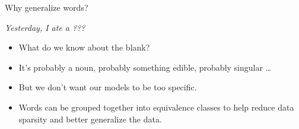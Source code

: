 \documentclass[xcolor=pdftex,x11names,table,hyperref]{beamer}
\begin{document}
\begin{frame}{Why generalize words?}
  \begin{center}
    \textit{Yesterday, I ate a ???}
  \end{center} \pause
  \begin{itemize}
  \item What do we know about the blank?\pause
  \item It's probably a noun, probably something edible, probably singular \ldots \pause
  \item But we don't want our models to be too specific.
  \end{itemize}
\end{frame}

\begin{frame}{}
\begin{itemize}
	\item Words can be grouped together into equivalence classes to help reduce data sparsity and better generalize the data.


\end{itemize}
\end{frame}
\end{document}
